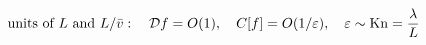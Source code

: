 \documentclass[preview]{standalone}
\begin{document}
\begin{align*}
\special{dvisvgm:raw <g id='unique000'>}\text{units of } L \text{ and } L/\bar v:\quad \mathcal D f=O(1),\quad C[f]=O(1/\varepsilon),\quad\varepsilon\sim\mathrm{Kn}=\frac{\lambda}{L}\special{dvisvgm:raw </g>}
\end{align*}
\end{document}
